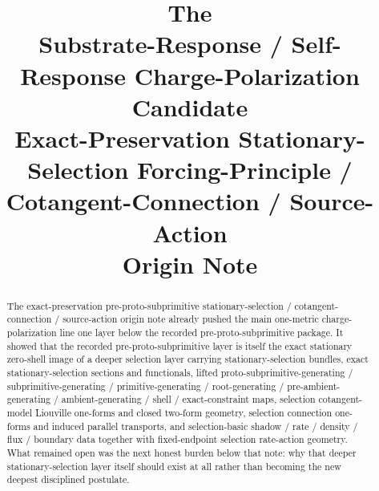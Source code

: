 \documentclass[11pt]{article}
\title{\textbf{The \TheoryName{}}\\[0.4em]
\large Substrate-Response / Self-Response Charge-Polarization Candidate\\
\large Exact-Preservation Stationary-Selection Forcing-Principle / Cotangent-Connection / Source-Action\\
\large Origin Note}
\author{}
\date{}
\begin{document}
\maketitle

\begin{abstract}
The exact-preservation pre-proto-subprimitive stationary-selection / cotangent-connection / source-action origin note already pushed the main one-metric charge-polarization line one layer below the recorded pre-proto-subprimitive package. It showed that the recorded pre-proto-subprimitive layer is itself the exact stationary zero-shell image of a deeper selection layer carrying stationary-selection bundles, exact stationary-selection sections and functionals, lifted proto-subprimitive-generating / subprimitive-generating / primitive-generating / root-generating / pre-ambient-generating / ambient-generating / shell / exact-constraint maps, selection cotangent-model Liouville one-forms and closed two-form geometry, selection connection one-forms and induced parallel transports, and selection-basic shadow / rate / density / flux / boundary data together with fixed-endpoint selection rate-action geometry. What remained open was the next honest burden below that note: why that deeper stationary-selection layer itself should exist at all rather than becoming the new deepest disciplined postulate.


\end{abstract}
\end{document}
